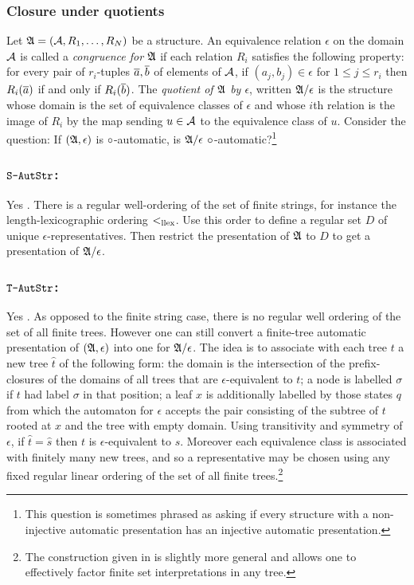 \subsubsection*{Closure under quotients} \label{AS:subsub:quotient}
Let $\mathfrak{A} = ({{\mathcal A}},R_1,\dots,R_N)$ be a structure.
An equivalence relation $\epsilon$ on the domain ${{\mathcal A}}$ is called a {\em congruence for $\mathfrak{A}$} if each relation $R_i$ satisfies the following property:
for every pair of $r_i$-tuples $\mbox{$\overline {a}$},\mbox{$\overline {b}$}$ of elements of ${{\mathcal A}}$, if $(a_j,b_j) \in  \epsilon$ for $1 \leq j \leq r_i$ then $R_i(\mbox{$\overline {a}$})$ if and only if $R_i(\mbox{$\overline {b}$})$.
The {\em quotient of $\mathfrak{A}$ by $\epsilon$}, written $\mathfrak{A}/\epsilon$ is the structure whose domain is the set of equivalence classes of $\epsilon$ and whose $i$th relation
is the image of $R_i$ by the map sending $u \in {{\mathcal A}}$ to the equivalence class of $u$. Consider the question:
If $(\mathfrak{A},\epsilon)$ is $\circ$-automatic, is $\mathfrak{A}/\epsilon$ $\circ$-automatic?\footnote{This question is sometimes phrased as asking if every structure with a non-injective automatic presentation has an injective automatic presentation.}

\subsubsection*{$\mbox{\tt S-AutStr}$:} Yes \cite{BlGr00}.
There is a regular well-ordering of the set of finite strings, for instance the length-lexicographic
ordering $<_{\text{llex}}$. Use this order to define a regular set $D$ of unique $\epsilon$-representatives.
Then restrict the presentation of $\mathfrak{A}$ to $D$ to get a presentation of $\mathfrak{A} / \epsilon$.

\subsubsection*{$\mbox{\tt T-AutStr}$:} Yes \cite{CoLo07}.
As opposed to the finite string case, there is no regular well ordering of the set of
all finite trees. 
However one can still convert a finite-tree automatic presentation of $(\mathfrak{A},\epsilon)$ into
one for $\mathfrak{A}/\epsilon$. The idea is to associate with each tree $t$ a
new tree $\hat{t}$ of the following form: the domain is the intersection 
of the prefix-closures of the domains of all trees that are $\epsilon$-equivalent to $t$; 
a node is labelled $\sigma$ if $t$ had label $\sigma$ in that position; 
a leaf $x$ is additionally labelled by those states $q$ from which the 
automaton for ${\epsilon}$ accepts the pair consisting of the subtree of $t$ 
rooted at $x$ and the tree with empty domain.
Using transitivity and symmetry of $\epsilon$, if $\hat{t} = \hat{s}$ 
then $t$ is $\epsilon$-equivalent to $s$. 
Moreover each equivalence class is associated with finitely many new trees, 
and so a representative may be chosen using any fixed regular linear ordering 
of the set of all finite trees.\footnote{The construction 
given in \cite{CoLo07} is slightly more general and allows one to effectively 
factor finite set interpretations in any tree.}

